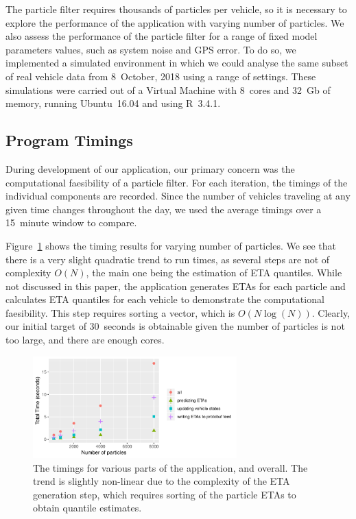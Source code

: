 The particle filter requires thousands of particles per vehicle,
so it is necessary to explore the performance of the application
with varying number of particles.
We also assess the performance of the particle filter
for a range of fixed model parameters values,
such as system noise and GPS error.
To do so, we implemented a simulated \rt environment
in which we could analyse the same subset of real vehicle data from 8~October, 2018
using a range of settings.
These simulations were carried out of a Virtual Machine 
with 8~cores and 32~Gb of memory, 
running Ubuntu~16.04 and using R~3.4.1.




\subsection{Program Timings}
\label{sec:timings}

During development of our application,
our primary concern was the computational faesibility of a particle filter.
For each iteration, 
the timings of the individual components are recorded.
Since the number of vehicles traveling at any given time changes throughout the day,
we used the average timings over a 15~minute window to compare.


Figure~\ref{fig:timings} shows the timing results for varying number of particles.
We see that there is a very slight quadratic trend to run times,
as several steps are not of complexity $O(N)$,
the main one being the estimation of ETA quantiles.
While not discussed in this paper,
the application generates ETAs for each particle
and calculates ETA quantiles for each vehicle to demonstrate the computational faesibility.
This step requires sorting a vector, which is $O(N\log(N))$.
Clearly, our initial target of 30~seconds is obtainable given the number of particles
is not too large, and there are enough cores.


\begin{figure}[tb]
    \centering
    \includegraphics[width=0.7\textwidth]{figures/04_model_results_timing.pdf}
    \caption{The timings for various parts of the application, and overall. %
        The trend is slightly non-linear due to the complexity of the ETA generation step, %
        which requires sorting of the particle ETAs to obtain quantile estimates.}
    \label{fig:timings}
\end{figure}




